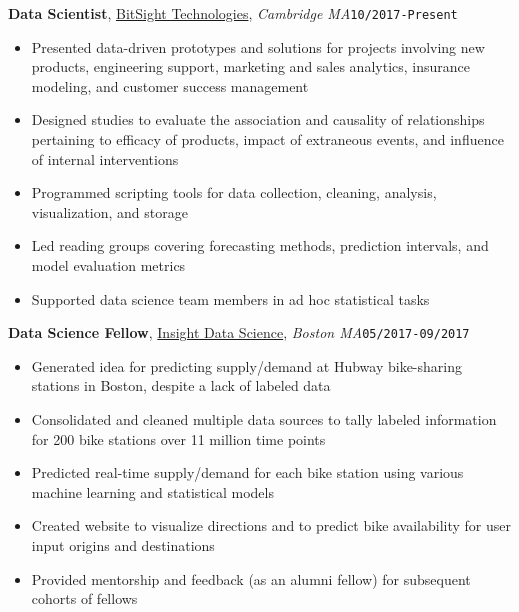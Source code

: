 \documentclass[10pt,english]{article}
\begin{document}
\textbf{Data Scientist}, \textcolor{blue}{\href{https://www.bitsighttech.com}{BitSight Technologies}}, \textit{Cambridge
MA}\hfill \texttt{10/2017-Present}
\begin{itemize}
\item Presented data-driven prototypes and solutions for projects involving new products, engineering support, marketing and sales analytics, insurance modeling, and customer success management
\item Designed studies to evaluate the association and causality of relationships pertaining to efficacy of products, impact of extraneous events, and influence of internal interventions
\item Programmed scripting tools for data collection, cleaning, analysis, visualization, and storage
\item Led reading groups covering forecasting methods, prediction intervals, and model evaluation metrics
\item Supported data science team members in ad hoc statistical tasks
\end{itemize}

\vspace{2mm}

\textbf{Data Science Fellow}, \textcolor{blue}{\href{https://www.insightdatascience.com}{Insight Data Science}}, \textit{Boston
MA}\hfill \texttt{05/2017-09/2017}
\begin{itemize}
\item Generated idea for predicting supply/demand at Hubway bike-sharing stations in Boston, despite a lack of labeled data
\item Consolidated and cleaned multiple data sources to tally labeled information for 200 bike stations over 11 million time points
\item Predicted real-time supply/demand for each bike station using various machine learning and statistical models
\item Created website to visualize directions and to predict bike availability for user input origins and destinations
\item Provided mentorship and feedback (as an alumni fellow) for subsequent cohorts of fellows
\end{itemize}
\end{document}
